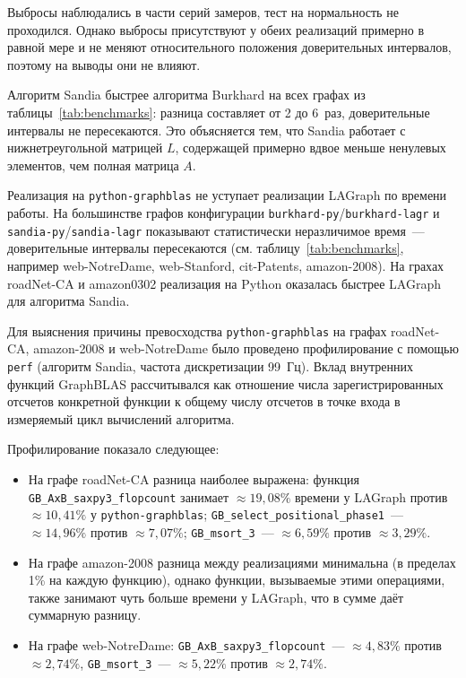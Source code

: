 \documentclass[a4paper]{article}
\begin{document}
Выбросы наблюдались в части серий замеров, тест на нормальность не проходился.
Однако выбросы присутствуют у обеих реализаций примерно в равной мере и не меняют относительного положения доверительных интервалов, поэтому на выводы они не влияют.

Алгоритм Sandia быстрее алгоритма Burkhard на всех графах из таблицы~\ref{tab:benchmarks}: разница составляет от 2 до 6~раз, доверительные интервалы не пересекаются.
Это объясняется тем, что Sandia работает с нижнетреугольной матрицей $L$, содержащей примерно вдвое меньше ненулевых элементов, чем полная матрица $A$.

Реализация на \texttt{python-graphblas} не уступает реализации LAGraph по времени работы.
На большинстве графов конфигурации \texttt{burkhard-py}/\allowbreak\texttt{burkhard-lagr} и \texttt{sandia-py}/\allowbreak\texttt{sandia-lagr} показывают статистически неразличимое время~--- доверительные интервалы пе\-ре\-се\-ка\-ют\-ся (см. таблицу~\ref{tab:benchmarks}, например web-NotreDame, web-Stanford, cit-Patents, amazon-2008).
На грахах roadNet-CA и amazon0302 реализация на Python оказалась быстрее LAGraph для алгоритма Sandia.

Для выяснения причины превосходства \texttt{python-graphblas} на графах roadNet-CA, amazon-2008 и web-NotreDame было проведено профилирование с помощью \texttt{perf} (алгоритм Sandia, частота дискретизации 99~Гц). Вклад внутренних функций GraphBLAS рас\-счи\-ты\-вал\-ся как отношение числа зарегистрированных отсчетов конкретной функции к общему числу отсчетов в точке входа в измеряемый цикл вычислений алгоритма.

Профилирование показало следующее:
\begin{itemize}
    \item На графе roadNet-CA разница наиболее выражена: функция \texttt{GB\_AxB\_saxpy3\_flopcount} занимает $\approx 19{,}08\%$ времени у LAGraph против $\approx 10{,}41\%$ у \texttt{python-graphblas}; \texttt{GB\_select\_positional\_phase1}~--- $\approx 14{,}96\%$ против $\approx 7{,}07\%$; \texttt{GB\_msort\_3}~--- $\approx 6{,}59\%$ против $\approx 3{,}29\%$.
    \item На графе amazon-2008 разница между реализациями минимальна (в пределах 1\% на каждую функцию), однако функции, вызываемые этими операциями, также занимают чуть больше времени у LAGraph, что в сумме даёт суммарную разницу.
    \item На графе web-NotreDame: \texttt{GB\_AxB\_saxpy3\_flopcount}~--- $\approx 4{,}83\%$ против $\approx 2{,}74\%$, \texttt{GB\_msort\_3}~--- $\approx 5{,}22\%$ против $\approx 2{,}74\%$.
\end{itemize}
\end{document}
